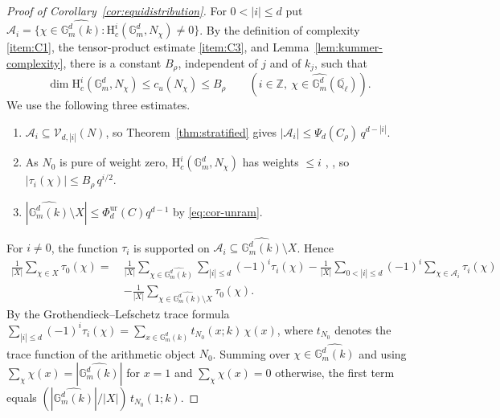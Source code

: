\documentclass[12pt,reqno]{amsart}
\theoremstyle{definition}
\theoremstyle{plain}
\theoremstyle{definition}
\theoremstyle{remark}
\newcommand{\bbG}{\mathbb{G}}  \newcommand{\bbH}{\mathbb{H}}
\newcommand{\bbQ}{\mathbb{Q}}  \newcommand{\bbR}{\mathbb{R}}
\newcommand{\HH}{\mathrm{H}}  \newcommand{\JJ}{\mathrm{J}}
\newcommand{\ol}[1]{\overline{#1}}
\newcommand{\Ql}{\bbQ_{\ell}}
\newcommand{\Gm}{\bbG_m}
\newcommand{\cu}{c_u}
\begin{document}
\begin{proof}[Proof of Corollary~\ref{cor:equidistribution}]
For \(0<|i|\le d\) put
\(\mathcal A_i=\{\chi\in\widehat{\Gm^d(k)}:\HH^i_c(\Gm^d,N_\chi)\neq0\}\).  By the definition of
complexity \ref{item:C1}, the tensor-product estimate
\ref{item:C3}, and Lemma~\ref{lem:kummer-complexity}, there is a constant \(B_\rho\), independent
of \(j\) and of \(k_j\), such that
\[
        \dim\HH^i_c(\Gm^d,N_\chi)\le\cu(N_\chi)\le B_\rho
        \qquad(i\in\mathbb Z,\ \chi\in\widehat{\Gm^d}(\ol\Ql)).
\]
We use the following three estimates.
\begin{enumerate}
\item[(a)] \(\mathcal A_i\subseteq\mathcal V_{d,|i|}(N)\), so Theorem~\ref{thm:stratified} gives
\(|\mathcal A_i|\le\Psi_{d}(C_\rho)\,q^{d-|i|}\).
\item[(b)] As \(N_0\) is pure of weight zero, \(\HH^i_c(\Gm^d,N_\chi)\) has weights \(\le i\)
\cite[3.3.1]{Del80}, \cite[5.1.13]{BBDG18}, so
\(|\tau_i(\chi)|\le B_\rho\,q^{i/2}\).
\item[(c)] \(|\widehat{\Gm^d(k)}\setminus X|\le\Phi^{\mathrm{ur}}_{d}(C)q^{d-1}\) by
\eqref{eq:cor-unram}.
\end{enumerate}

For \(i\neq0\), the function \(\tau_i\) is supported on
\(\mathcal A_i\subseteq\widehat{\Gm^d(k)}\setminus X\).  Hence
\[
\begin{aligned}
        \frac{1}{|X|}\sum_{\chi\in X}\tau_0(\chi)
        =\ &\frac{1}{|X|}\sum_{\chi\in\widehat{\Gm^d(k)}}\sum_{|i|\le d}(-1)^i\tau_i(\chi)
        -\frac{1}{|X|}\sum_{0<|i|\le d}(-1)^i\sum_{\chi\in\mathcal A_i}\tau_i(\chi)\\
        &-\frac{1}{|X|}\sum_{\chi\in\widehat{\Gm^d(k)}\setminus X}\tau_0(\chi).
\end{aligned}
\]
By the Grothendieck--Lefschetz trace formula \(\sum_{|i|\le d}(-1)^i\tau_i(\chi)=\sum_{x\in \Gm^d(k)}
t_{N_0}(x;k)\,\chi(x)\), where \(t_{N_0}\) denotes the trace function of the arithmetic object
\(N_0\).  Summing over
\(\chi\in\widehat{\Gm^d(k)}\) and using
\(\sum_\chi\chi(x)=|\widehat{\Gm^d(k)}|\) for \(x=1\) and \(\sum_\chi\chi(x)=0\) otherwise, the first term
equals \((|\widehat{\Gm^d(k)}|/|X|)\,t_{N_0}(1;k)\).


\end{proof}
\end{document}
